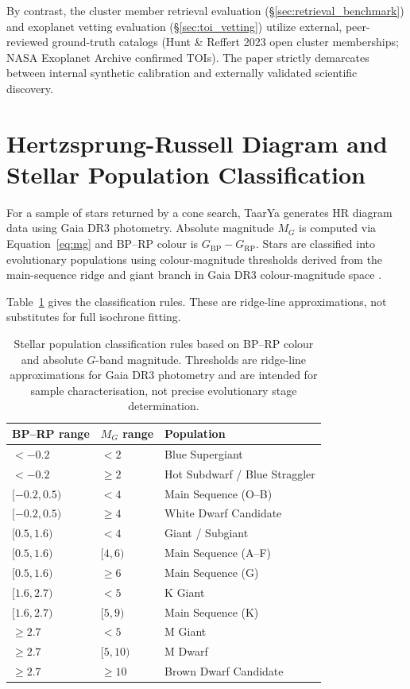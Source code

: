 \documentclass[preprint,12pt,authoryear]{elsarticle}
\begin{document}
By contrast, the cluster member retrieval evaluation (\S\ref{sec:retrieval_benchmark}) and exoplanet vetting evaluation (\S\ref{sec:toi_vetting}) utilize external, peer-reviewed ground-truth catalogs (Hunt \& Reffert 2023 open cluster memberships; NASA Exoplanet Archive confirmed TOIs). The paper strictly demarcates between internal synthetic calibration and externally validated scientific discovery.

\section{Hertzsprung-Russell Diagram and Stellar Population Classification}
\label{sec:hr}

For a sample of stars returned by a cone search, \textsf{TaarYa} generates HR diagram data using Gaia DR3 photometry. Absolute magnitude $M_G$ is computed via Equation~\eqref{eq:mg} and BP--RP colour is $G_{\mathrm{BP}} - G_{\mathrm{RP}}$. Stars are classified into evolutionary populations using colour-magnitude thresholds derived from the main-sequence ridge and giant branch in Gaia DR3 colour-magnitude space \citep{Vallenari2023, Lindegren2021}.

Table~\ref{tab:population} gives the classification rules. These are ridge-line approximations, not substitutes for full isochrone fitting.

\begin{table}[htbp]
\centering
\caption{Stellar population classification rules based on BP--RP colour and absolute $G$-band magnitude. Thresholds are ridge-line approximations for Gaia DR3 photometry and are intended for sample characterisation, not precise evolutionary stage determination.}
\label{tab:population}
\begin{tabular}{p{3.5cm}p{3.5cm}p{6.0cm}}
\toprule
\textbf{BP--RP range} & \textbf{$M_G$ range} & \textbf{Population} \\
\midrule
$< -0.2$ & $< 2$ & Blue Supergiant \\
$< -0.2$ & $\ge 2$ & Hot Subdwarf / Blue Straggler \\
$[ -0.2, 0.5)$ & $< 4$ & Main Sequence (O--B) \\
$[ -0.2, 0.5)$ & $\ge 4$ & White Dwarf Candidate \\
$[0.5, 1.6)$ & $< 4$ & Giant / Subgiant \\
$[0.5, 1.6)$ & $[4, 6)$ & Main Sequence (A--F) \\
$[0.5, 1.6)$ & $\ge 6$ & Main Sequence (G) \\
$[1.6, 2.7)$ & $< 5$ & K Giant \\
$[1.6, 2.7)$ & $[5, 9)$ & Main Sequence (K) \\
$\ge 2.7$ & $< 5$ & M Giant \\
$\ge 2.7$ & $[5, 10)$ & M Dwarf \\
$\ge 2.7$ & $\ge 10$ & Brown Dwarf Candidate \\
\bottomrule
\end{tabular}
\end{table}
\end{document}
